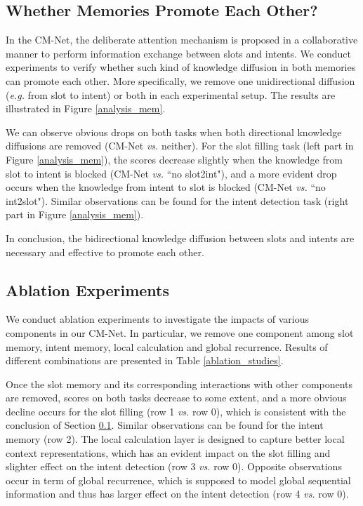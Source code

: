 \documentclass[11pt,a4paper]{article}
\begin{document}
\subsection{Whether Memories Promote Each Other?}
\label{analysis_promote_each_other}
In the CM-Net, the deliberate attention mechanism is proposed in a collaborative manner to perform information exchange between slots and intents. We conduct experiments to verify whether such kind of knowledge diffusion in both memories can promote each other. 
More specifically, we remove one unidirectional diffusion ({\em e.g.} from slot to intent) or both in each experimental setup. The results are illustrated in Figure \ref{analysis_mem}.

We can observe obvious drops on both tasks when both directional knowledge diffusions are removed (CM-Net {\em vs.} neither). For the slot filling task (left part in Figure \ref{analysis_mem}), the  scores decrease slightly when the knowledge from slot to intent is blocked (CM-Net {\em vs.} ``no slot2int"), and a more evident drop occurs when the knowledge from intent to slot is blocked (CM-Net {\em vs.} ``no int2slot"). Similar observations can be found for the intent detection task (right part in Figure \ref{analysis_mem}).

In conclusion, the bidirectional knowledge diffusion between slots and intents are necessary and effective to promote each other.

\subsection{Ablation Experiments}
\label{ablation_experiment}
We conduct ablation experiments to investigate the impacts of various components in our CM-Net. In particular, we remove one component among slot memory, intent memory, local calculation and global recurrence. Results of different combinations are presented in Table \ref{ablation_studies}. 

Once the slot memory and its corresponding interactions with other components are removed, scores on both tasks decrease to some extent, and a more obvious decline occurs for the slot filling (row 1 {\em vs.} row 0), which is consistent with the conclusion of Section \ref{analysis_promote_each_other}. Similar observations can be found for the intent memory (row 2). The local calculation layer is designed to capture better local context representations, which has an evident impact on the slot filling and slighter effect on the intent detection (row 3 {\em vs.} row 0). Opposite observations occur in term of global recurrence, which is supposed to model global sequential information and thus has larger effect on the intent detection (row 4 {\em vs.} row 0).
\end{document}
